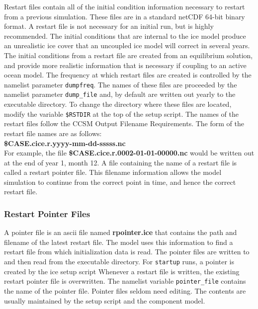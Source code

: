 
Restart files contain all of the initial condition information
necessary to restart from a previous simulation.  These files are in a
standard netCDF 64-bit binary format. A restart file is not necessary for
an initial run, but is highly recommended.  The initial conditions
that are internal to the ice model produce an unrealistic ice cover
that an uncoupled ice model will correct in several years.  The initial
conditions from a restart file are created from an equilibrium solution,
and provide more realistic information that is necessary if coupling
to an active ocean model.  The frequency at which restart files are created
is controlled by the namelist parameter {\tt dumpfreq}. 
The names of these files are proceeded by the namelist parameter 
{\tt dump\_file} and, by default are written out yearly to
the executable directory.  To change the directory where these files are
located, modify the variable {\tt \$RSTDIR} at the top of the setup script.
The names of the restart files follow the CCSM Output Filename Requirements.
The form of the restart file names are as follows: \\

{\bf \$CASE.cice.r.yyyy-mm-dd-sssss.nc} \\

For example, the file {\bf \$CASE.cice.r.0002-01-01-00000.nc} would be written
out at the end of year 1, month 12.  A file containing the name of a restart
file is called a restart pointer file. This filename information allows the
model simulation to continue from the correct point in time, and hence the
correct restart file.

\subsubsection*{Restart Pointer Files}
\label{pointer_files}

A pointer file is an ascii file named {\bf rpointer.ice} that contains the
path and filename of the latest restart file. The model uses this information to find
a restart file from which initialization data is read.  The pointer files are
written to and then read from the executable directory. For 
{\tt startup} runs, a pointer is created by the ice setup script 
Whenever a restart file is written, the existing restart pointer file 
is overwritten.  The namelist variable {\tt pointer\_file} contains the
name of the pointer file. Pointer files seldom need editing.  The contents
are usually maintained by the setup script and the component model. 


